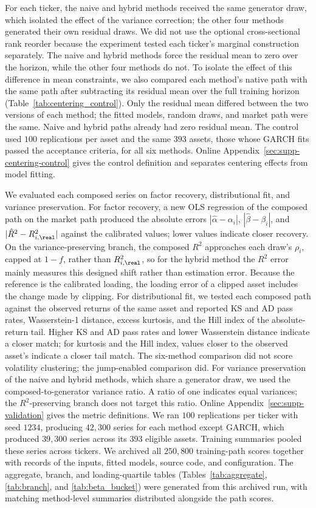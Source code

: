 For each ticker, the naive and hybrid methods received the same
generator draw, which isolated the effect of the variance correction;
the other four methods generated their own residual draws. We did not
use the optional cross-sectional rank reorder because the experiment
tested each ticker's marginal construction separately. The naive and
hybrid methods force the residual mean to zero over the horizon,
while the other four methods do not. To isolate the effect of this
difference in mean constraints, we also compared each method's native
path with the same path after subtracting its residual mean over the
full training horizon (Table~\ref{tab:centering_control}). Only the residual mean differed between the two versions of each
method; the fitted models, random draws, and market path were the
same. Naive and hybrid
paths already had zero residual mean. The control used $100$
replications per asset and the same $393$ assets, those whose GARCH fits passed the acceptance
criteria, for all six methods. Online
Appendix~\ref{sec:supp-centering-control} gives the control definition
and separates centering effects from model fitting.

We evaluated each composed series on factor recovery, distributional
fit, and variance preservation. For factor recovery, a new OLS
regression of the composed path on the market path produced the
absolute errors $|\hat\alpha-\alpha_i|$, $|\hat\beta-\beta_i|$, and
$|\hat R^2-R^2_{i,\real}|$
against the calibrated values; lower values indicate closer recovery.
On the variance-preserving branch, the composed $R^2$ approaches each
draw's $\rho_i$, capped at $1-f$, rather than $R^2_{i,\real}$, so for
the hybrid method the $R^2$ error mainly measures this designed shift
rather than estimation error.
Because the reference is the calibrated loading, the loading error of
a clipped asset includes the change made by clipping. For distributional fit, we tested each composed path against the
observed returns of the same asset and reported KS and AD pass rates,
Wasserstein-1 distance, excess kurtosis, and the Hill index of the
absolute-return tail. Higher KS and AD pass rates and lower Wasserstein distance indicate a
closer match; for kurtosis and the Hill index, values closer to the observed asset's indicate a closer tail
match. The six-method comparison did not score volatility clustering;
the jump-enabled comparison did. For variance preservation of the naive and hybrid methods, which share
a generator draw, we used the composed-to-generator variance ratio. A
ratio of one indicates equal variances; the $R^2$-preserving branch
does not target this ratio.
Online Appendix~\ref{sec:supp-validation} gives the metric definitions.
We ran $100$ replications per ticker with seed $1234$, producing $42{,}300$ series for each method except GARCH, which
produced $39{,}300$ series across its $393$ eligible assets. Training
summaries pooled these series across tickers.
We archived all $250{,}800$ training-path scores together with records
of the inputs, fitted models, source code, and configuration. The
aggregate, branch, and loading-quartile tables
(Tables~\ref{tab:aggregate}, \ref{tab:branch}, and
\ref{tab:beta_bucket}) were generated from this archived run, with matching method-level summaries distributed
alongside the path scores.

